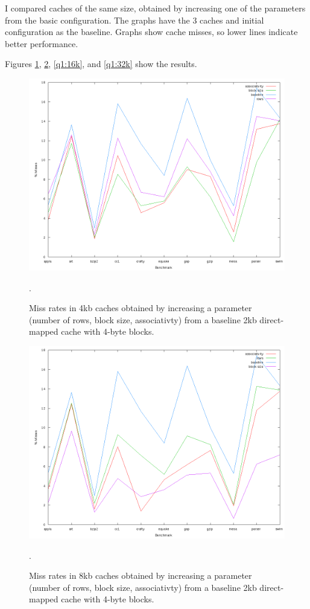 I compared caches of the same size, obtained by increasing one of the
parameters from the basic configuration. The graphs have the 3 caches and
initial configuration as the baseline. Graphs show cache misses, so lower lines
indicate better performance.

Figures \ref{q1:4k}, \ref{q1:8k}, \ref{q1:16k}, and \ref{q1:32k} show the
results.

\begin{figure}[htb]
  \includegraphics[width=6.8in]{6.823/lab2/figs/ccc_4k.png}
  \caption{Miss rates in 4kb caches obtained by increasing a parameter
  (number of rows, block size, associativty) from a baseline 2kb direct-mapped
  cache with 4-byte blocks.} \label{q1:4k}.
\end{figure}

\begin{figure}[htb]
  \includegraphics[width=6.8in]{6.823/lab2/figs/ccc_8k.png}
  \caption{Miss rates in 8kb caches obtained by increasing a parameter
  (number of rows, block size, associativty) from a baseline 2kb direct-mapped
  cache with 4-byte blocks.} \label{q1:8k}.
\end{figure}

